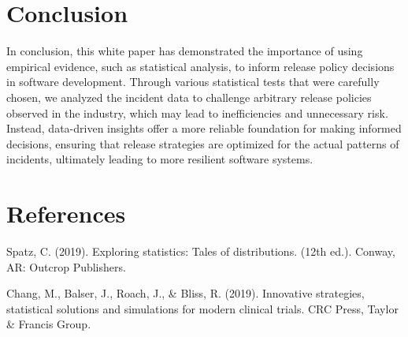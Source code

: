 \documentclass{article}
\begin{document}
\section{Conclusion}

In conclusion, this white paper has demonstrated the importance of using empirical evidence, such as statistical analysis, to inform release policy decisions in software development. Through various statistical tests that were carefully chosen, we analyzed the incident data to challenge arbitrary release policies observed in the industry, which may lead to inefficiencies and unnecessary risk. Instead, data-driven insights offer a more reliable foundation for making informed decisions, ensuring that release strategies are optimized for the actual patterns of incidents, ultimately leading to more resilient software systems.


\newpage

\section{References}

Spatz, C. (2019). Exploring statistics: Tales of distributions. (12th ed.). Conway, AR: Outcrop Publishers. 

\vspace{5mm}

\noindent Chang, M., Balser, J., Roach, J., \& Bliss, R. (2019). Innovative strategies, statistical solutions and
simulations for modern clinical trials. CRC Press, Taylor \& Francis Group.
\end{document}
